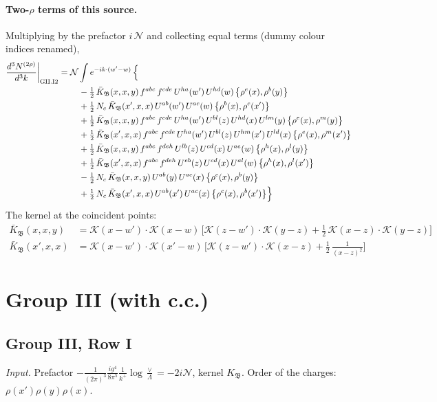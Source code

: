 \documentclass[10pt]{article}
\numberwithin{equation}{section}
\newcommand{\KK}{\mathcal K}
\newcommand{\NN}{\mathcal N}
\begin{document}
\paragraph{Two-$\rho$ terms of this source.} Multiplying by the prefactor $i\,\NN$ and collecting equal terms (dummy colour indices renamed),
\begin{align}
\frac{d^3N^{(2\rho)}}{d^3k}\bigg|_{\rm GII.I2}={}&\NN\int e^{-ik\cdot(w'-w)}\,\Big\{\notag\\
&\quad -\tfrac12\,\bar K_{\mathfrak B}(x,x,y)\,f^{abc}\,f^{cde}\,U^{ha}(w')\,U^{hd}(w)\,\big\{\rho^{e}(x),\rho^{b}(y)\big\}\notag\\
&\quad +\tfrac12\,N_{c}\,\bar K_{\mathfrak B}(x',x,x)\,U^{ab}(w')\,U^{ac}(w)\,\big\{\rho^{b}(x),\rho^{c}(x')\big\}\notag\\
&\quad +\tfrac12\,\bar K_{\mathfrak B}(x,x,y)\,f^{abc}\,f^{cde}\,U^{ha}(w')\,U^{bl}(z)\,U^{hd}(x)\,U^{lm}(y)\,\big\{\rho^{e}(x),\rho^{m}(y)\big\}\notag\\
&\quad +\tfrac12\,\bar K_{\mathfrak B}(x',x,x)\,f^{abc}\,f^{cde}\,U^{ha}(w')\,U^{bl}(z)\,U^{hm}(x')\,U^{ld}(x)\,\big\{\rho^{e}(x),\rho^{m}(x')\big\}\notag\\
&\quad +\tfrac12\,\bar K_{\mathfrak B}(x,x,y)\,f^{abc}\,f^{deh}\,U^{lb}(z)\,U^{cd}(x)\,U^{ae}(w)\,\big\{\rho^{h}(x),\rho^{l}(y)\big\}\notag\\
&\quad +\tfrac12\,\bar K_{\mathfrak B}(x',x,x)\,f^{abc}\,f^{deh}\,U^{eb}(z)\,U^{cd}(x)\,U^{al}(w)\,\big\{\rho^{h}(x),\rho^{l}(x')\big\}\notag\\
&\quad -\tfrac12\,N_{c}\,\bar K_{\mathfrak B}(x,x,y)\,U^{ab}(y)\,U^{ac}(x)\,\big\{\rho^{c}(x),\rho^{b}(y)\big\}\notag\\
&\quad +\tfrac12\,N_{c}\,\bar K_{\mathfrak B}(x',x,x)\,U^{ab}(x')\,U^{ac}(x)\,\big\{\rho^{c}(x),\rho^{b}(x')\big\}\Big\}\label{eq:res-GII.I2}
\end{align}
The kernel at the coincident points:
\begin{align*}
\bar K_{\mathfrak B}(x,x,y)&=\KK(x-w')\cdot\KK(x-w)\,\Big[\KK(z-w')\cdot\KK(y-z)+\tfrac12\,\KK(x-z)\cdot\KK(y-z)\Big]\\\bar K_{\mathfrak B}(x',x,x)&=\KK(x-w')\cdot\KK(x'-w)\,\Big[\KK(z-w')\cdot\KK(x-z)+\tfrac12\,\frac{1}{(x-z)^2}\Big]
\end{align*}
\section{Group III (with c.c.)}\label{sec:G3}
\subsection{Group III, Row I}\label{sec:GIII.I}
\emph{Input.} Prefactor $-\frac{1}{(2\pi)^3}\frac{ig^4}{8\pi^5}\frac1{k^+}\log\frac\vee\Lambda=-2i\NN$, kernel $K_{\mathfrak B}$. Order of the charges: $\rho(x')\rho(y)\rho(x)$.
\end{document}
